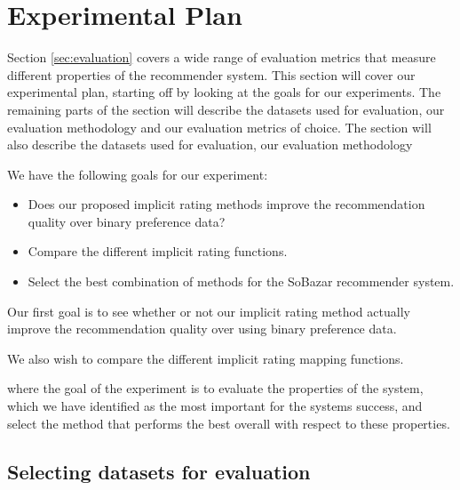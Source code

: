 
\section{Experimental Plan}


Section \ref{sec:evaluation} covers a wide range of evaluation metrics that
measure different properties of the recommender system. This section will cover
our experimental plan, starting off by looking at the goals for our experiments.
The remaining parts of the section will describe the datasets used for evaluation,
our evaluation methodology and our evaluation metrics of choice.
The section will also describe the datasets used for evaluation, our evaluation methodology

We have the following goals for our experiment:

\begin{itemize}
	\item Does our proposed implicit rating methods improve the recommendation quality over
	binary preference data?
	\item Compare the different implicit rating functions.
	\item Select the best combination of methods for the SoBazar recommender system. 
\end{itemize}


Our first goal is to see whether or not our implicit rating method actually improve the
recommendation quality over using binary preference data.

We also wish to compare the different implicit rating mapping functions.

where the goal of the experiment is to evaluate the properties
of the system, which we have identified as the most important for the systems success,
and select the method that performs the best overall with respect to these properties.

\subsection{Selecting datasets for evaluation}

